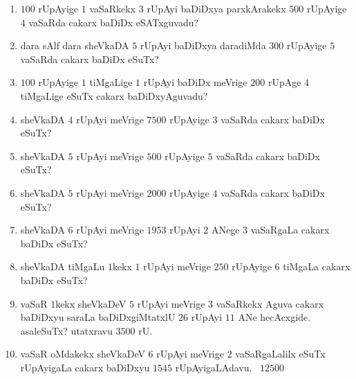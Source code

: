 \begin{enumerate}[\rm (1)]
\item $100$ rUpAyige $1$ vaSaRkekx $3$ rUpAyi baDiDxya parxkArakekx $500$ rUpAyige $4$ vaSaRda cakarx baDiDx eSATxguvadu?

\item dara sAlf dara sheVkaDA $5$ rUpAyi baDiDxya daradiMda $300$ rUpAyige $5$ vaSaRda cakarx baDiDx eSuTx?

\item $100$ rUpAyige $1$ tiMgaLige $1$ rUpAyi baDiDx meVrige $200$ rUpAge $4$ tiMgaLige eSuTx cakarx baDiDxyAguvadu?

\item sheVkaDA $4$ rUpAyi meVrige $7500$ rUpAyige $3$ vaSaRda cakarx baDiDx eSuTx?

\item sheVkaDA $5$ rUpAyi meVrige $500$ rUpAyige $5$ vaSaRda cakarx baDiDx eSuTx?

\item sheVkaDA $5$ rUpAyi meVrige $2000$ rUpAyige $4$ vaSaRda cakarx baDiDx eSuTx?

\item sheVkaDA $6$ rUpAyi meVrige $1953$ rUpAyi $2$ ANege $3$ vaSaRgaLa cakarx baDiDx eSuTx?

\item sheVkaDA tiMgaLu $1$kekx $1$ rUpAyi meVrige $250$ rUpAyige $6$ tiMgaLa cakarx baDiDx eSuTx?

\item vaSaR $1$kekx sheVkaDeV $5$ rUpAyi meVrige $3$ vaSaRkekx Aguva cakarx baDiDxyu saraLa baDiDxgiMtatxlU $26$ rUpAyi $11$ ANe hecAcxgide. asaleSuTx? \hfill utatxravu\; $3500$\; rU.

\item vaSaR oMdakekx sheVkaDeV $6$ rUpAyi meVrige $2$ vaSaRgaLalilx eSuTx rUpAyigaLa cakarx baDiDxyu $1545$ rUpAyigaLAdavu. \hfill \hbox{\; $12500$\; }
\end{enumerate}





